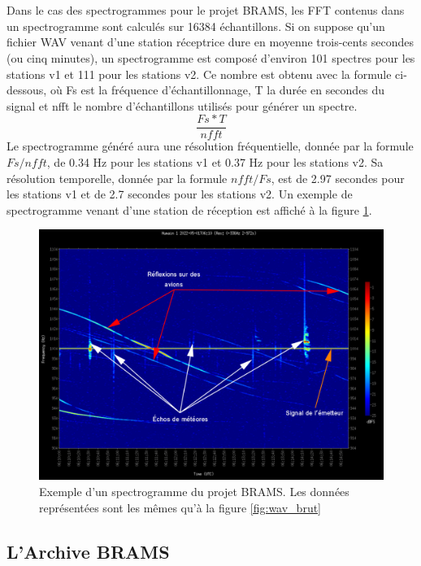 \documentclass[11pt]{article}
\begin{document}
\\
\\
Dans le cas des spectrogrammes pour le projet BRAMS, les FFT contenus dans un spectrogramme sont calculés sur 16384 échantillons.
Si on suppose qu'un fichier WAV venant d'une station réceptrice dure en moyenne trois-cents secondes (ou cinq minutes), un spectrogramme est composé d'environ 101 spectres pour les stations v1 et 111 pour les stations v2.
Ce nombre est obtenu avec la formule ci-dessous, où Fs est la fréquence d'échantillonnage, T la durée en secondes du signal et nfft le nombre d'échantillons utilisés pour générer un spectre.
\[\frac{Fs * T}{nfft}\]
Le spectrogramme généré aura une résolution fréquentielle, donnée par la formule \(Fs / nfft\), de 0.34 Hz pour les stations v1 et 0.37 Hz pour les stations v2.
Sa résolution temporelle, donnée par la formule \(nfft / Fs\), est de 2.97 secondes pour les stations v1 et de 2.7 secondes pour les stations v2.
Un exemple de spectrogramme venant d'une station de réception est affiché à la figure \ref{fig:spectro_brams-a}.

\begin{figure}[t]
    \begin{center}
        \includegraphics[scale=0.29]{spectrogramme_legend.png}
        \caption{Exemple d'un spectrogramme du projet BRAMS. Les données représentées sont les mêmes qu'à la figure \ref{fig:wav_brut}}
        \label{fig:spectro_brams-a}
    \end{center}
\end{figure}

\subsection{L'Archive BRAMS}
\end{document}
